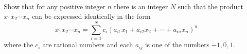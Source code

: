 Show that for any positive integer $n$ there is an integer $N$ such that
the product $x_1 x_2 \cdots x_n$ can be expressed identically in the form
\[
x_1 x_2 \cdots x_n =
\sum_{i=1}^N  c_i
( a_{i1} x_1 + a_{i2} x_2 + \cdots + a_{in} x_n )^n
\]
where the $c_i$ are rational numbers and each $a_{ij}$ is one of the
numbers $-1, 0, 1$.
